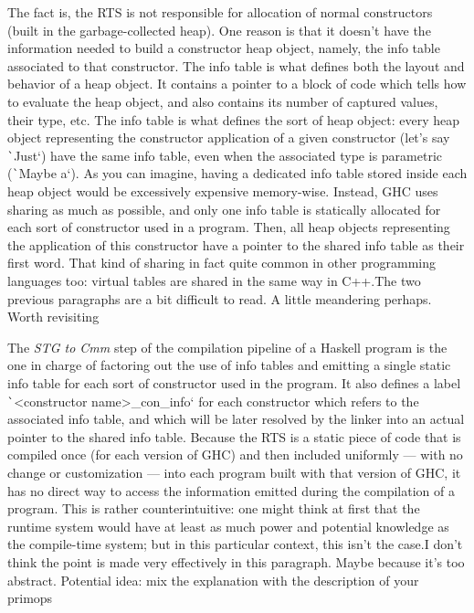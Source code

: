 \documentclass[english]{jflart}
\newcommand{\TODO}[1]{{\color{red}\large #1}}
\begin{document}
The fact is, the RTS is not responsible for allocation of normal constructors (built in the garbage-collected heap). One reason is that it doesn't have the information needed to build a constructor heap object, namely, the info table associated to that constructor. The info table is what defines both the layout and behavior of a heap object. It contains a pointer to a block of code which tells how to evaluate the heap object, and also contains its number of captured values, their type, etc. The info table is what defines the sort of heap object: every heap object representing the constructor application of a given constructor (let's say \texttt`Just`) have the same info table, even when the associated type is parametric (\texttt`Maybe a`). As you can imagine, having a dedicated info table stored inside each heap object would be excessively expensive memory-wise. Instead, GHC uses sharing as much as possible, and only one info table is statically allocated for each sort of constructor used in a program. Then, all heap objects representing the application of this constructor have a pointer to the shared info table as their first word. That kind of sharing in fact quite common in other programming languages too: virtual tables are shared in the same way in C++.\TODO{The two previous paragraphs are a bit difficult to read. A little meandering perhaps. Worth revisiting}

The \emph{STG to Cmm} step of the compilation pipeline of a Haskell program is the one in charge of factoring out the use of info tables and emitting a single static info table for each sort of constructor used in the program. It also defines a label \texttt`<constructor name>_con_info` for each constructor which refers to the associated info table, and which will be later resolved by the linker into an actual pointer to the shared info table. Because the RTS is a static piece of code that is compiled once (for each version of GHC) and then included uniformly --- with no change or customization --- into each program built with that version of GHC, it has no direct way to access the information emitted during the compilation of a program. This is rather counterintuitive: one might think at first that the runtime system would have at least as much power and potential knowledge as the compile-time system; but in this particular context, this isn't the case.\TODO{I don't think the point is made very effectively in this paragraph. Maybe because it's too abstract. Potential idea: mix the explanation with the description of your primops}
\end{document}
